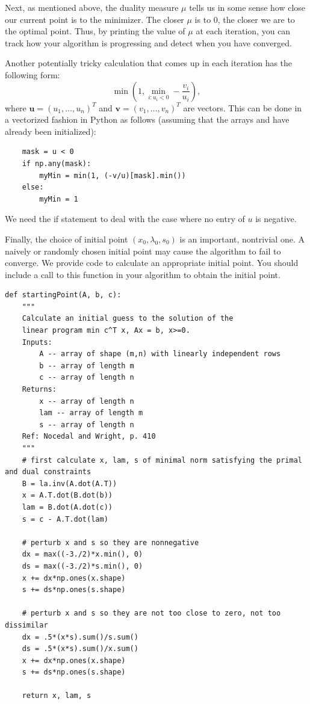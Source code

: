 Next, as mentioned above, the duality measure $\mu$ tells us in some sense how close our current point is to the minimizer.
The closer $\mu$ is to 0, the closer we are to the optimal point. Thus, by printing the value of $\mu$ at
each iteration, you can track how your algorithm is progressing and detect when you have converged.

Another potentially tricky calculation that comes up in each iteration has the following form:
\[
\min\left(1, \displaystyle\min_{i : u_i < 0}-\frac{v_i}{u_i}\right),
\]
where $\mathbf{u} = (u_1, \ldots, u_n)^T$ and $\mathbf{v} = (v_1, \ldots, v_n)^T$ are vectors.
This can be done in a vectorized fashion in Python as follows (assuming that the arrays  and 
have already been initialized):
\begin{lstlisting}
    mask = u < 0
    if np.any(mask):
        myMin = min(1, (-v/u)[mask].min())
    else:
        myMin = 1
\end{lstlisting}
We need the if statement to deal with the case where no entry of $u$ is negative.

Finally, the choice of initial point $(x_0, \lambda_0, s_0)$ is an important, nontrivial one.
A naively or randomly chosen initial point may cause the algorithm to fail to converge.
We provide code to calculate an appropriate initial point. You should include a call to this function in your algorithm to obtain the initial point.

\begin{lstlisting}
def startingPoint(A, b, c):
    """
    Calculate an initial guess to the solution of the
    linear program min c^T x, Ax = b, x>=0.
    Inputs:
        A -- array of shape (m,n) with linearly independent rows
        b -- array of length m
        c -- array of length n
    Returns:
        x -- array of length n
        lam -- array of length m
        s -- array of length n
    Ref: Nocedal and Wright, p. 410
    """
    # first calculate x, lam, s of minimal norm satisfying the primal and dual constraints
    B = la.inv(A.dot(A.T))
    x = A.T.dot(B.dot(b))
    lam = B.dot(A.dot(c))
    s = c - A.T.dot(lam)

    # perturb x and s so they are nonnegative
    dx = max((-3./2)*x.min(), 0)
    ds = max((-3./2)*s.min(), 0)
    x += dx*np.ones(x.shape)
    s += ds*np.ones(s.shape)

    # perturb x and s so they are not too close to zero, not too dissimilar
    dx = .5*(x*s).sum()/s.sum()
    ds = .5*(x*s).sum()/x.sum()
    x += dx*np.ones(x.shape)
    s += ds*np.ones(s.shape)

    return x, lam, s
\end{lstlisting}


